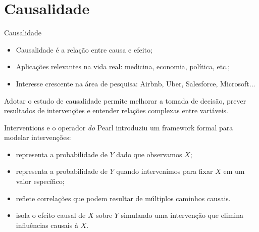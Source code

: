 \section{Causalidade}

\begin{frame}{Causalidade}
    \begin{itemize}
        \item Causalidade é a relação entre causa e efeito;
        \item Aplicações relevantes na vida real: medicina, economia, política, etc.;
        \item Interesse crescente na área de pesquisa: Airbnb, Uber, Salesforce, Microsoft...
    \end{itemize}
    \vspace{20pt}
    Adotar o estudo de causalidade permite melhorar a tomada de decisão, prever resultados de intervenções e entender relações complexas entre variáveis.
\end{frame}

\begin{frame}{Interventions e o operador \emph{do}}
    Pearl introduziu um framework formal para modelar intervenções:

    \begin{itemize}
        \item {} representa a probabilidade de $Y$ dado que observamos $X$;
        \item {} representa a probabilidade de $Y$ quando intervenimos para fixar $X$ em um valor específico;
    \end{itemize}

    \pause
    \begin{itemize}
        \item {} reflete correlações que podem resultar de múltiplos caminhos causais.
        \item {} isola o efeito causal de $X$ sobre $Y$ simulando uma intervenção que elimina influências causais à $X$.
    \end{itemize}
\end{frame}

